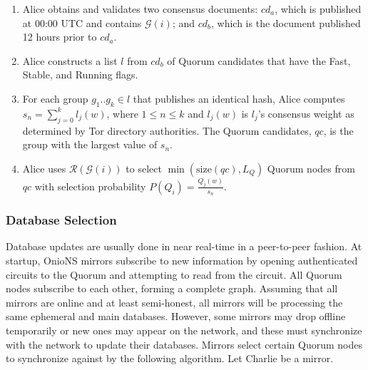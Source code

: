\documentclass[USenglish,oneside,twocolumn]{article}
\begin{document}
\begin{enumerate}
	\item Alice obtains and validates two consensus documents: $ \mathit{cd}_{a} $, which is published at 00:00 UTC and contains $ \mathcal{G}(i) $; and $ \mathit{cd}_{b} $, which is the document published 12 hours prior to $ \mathit{cd}_{a} $. 
	\item Alice constructs a list $ l $ from $ \mathit{cd}_{b} $ of Quorum candidates that have the Fast, Stable, and Running flags.
	\item For each group $ g_{1} .. g_{k} \in l $ that publishes an identical hash, Alice computes $ s_{n} = \sum_{j=0}^{k} l_{j}(w) $, where $ 1 \leq n \leq k $ and $ l_{j}(w) $ is $ l_{j} $'s consensus weight as determined by Tor directory authorities. The Quorum candidates, $ \mathit{qc} $, is the group with the largest value of $ s_{n} $.
	\item Alice uses $ \mathcal{R}(\mathcal{G}(i)) $ to select $ \min(\mathrm{size}(\mathit{qc}), L_{Q}) $ Quorum nodes from $ \mathit{qc} $ with selection probability $ P(Q_{i}) = \frac{Q_{j}(w)}{s_{n}} $.
\end{enumerate}

\subsubsection{Database Selection} %


Database updates are usually done in near real-time in a peer-to-peer fashion. At startup, OnioNS mirrors subscribe to new information by opening authenticated circuits to the Quorum and attempting to read from the circuit. All Quorum nodes subscribe to each other, forming a complete graph. Assuming that all mirrors are online and at least semi-honest, all mirrors will be processing the same ephemeral and main databases. However, some mirrors may drop offline temporarily or new ones may appear on the network, and these must synchronize with the network to update their databases. Mirrors select certain Quorum nodes to synchronize against by the following algorithm. Let Charlie be a mirror.
\end{document}
